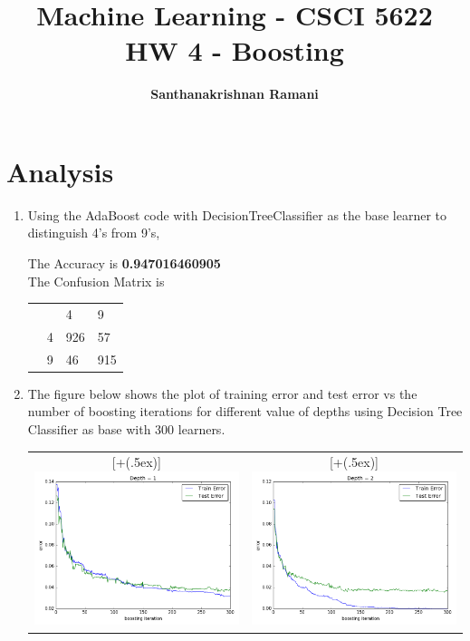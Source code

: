 \documentclass{article}
\date{\displaydate{date}}
\title{\textbf{Machine Learning - CSCI 5622} \\
HW 4 - Boosting}
\author{\textbf{Santhanakrishnan Ramani}}
\newcommand*{\addheight}[2][.5ex]{%
  \raisebox{0pt}[\dimexpr\height+(#1)\relax]{#2}%
}
\begin{document}
\maketitle

\section*{Analysis}
\begin{enumerate}
\item
Using the AdaBoost code with DecisionTreeClassifier as the base learner to distinguish 4's from 9's,

The Accuracy is \textbf{0.947016460905}\\
The Confusion Matrix is 
\begin{minipage}[b]{0.4\textwidth}
    \begin{tabular}{l r|l l}                      
		& \multicolumn{1}{r|}{} &4   &9   \\ \cline{2-4}
		& \multicolumn{1}{r|}{4} &926   &57  \\
		& \multicolumn{1}{r|}{9} &46   &915  \\ 
	\end{tabular}
\end{minipage} 
\item
The figure below shows the plot of training error and test error vs the number of boosting iterations for different value of depths using Decision Tree Classifier as base with 300 learners.
\begin{table}[h!]
\centering
\begin{tabular}{|c|c|}
	\hline
	\addheight{\includegraphics[width=70mm]{images/decision/1.png}} &
	\addheight{\includegraphics[width=70mm]{images/decision/2.png}} \\  

\end{tabular}
\end{table}
\end{enumerate}
\end{document}
